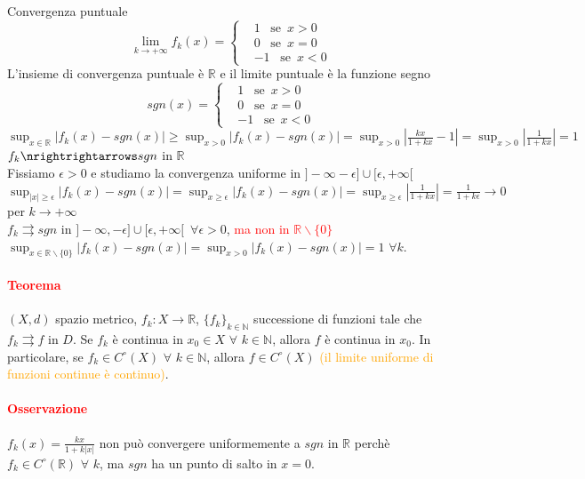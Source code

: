 \documentclass{article}
\newcommand{\R}{\mathbb{R}}
\newcommand{\N}{\mathbb{N}}
\begin{document}
Convergenza puntuale
\begin{equation*}
    \lim_{k\rightarrow +\infty} f_k(x) = \begin{cases}
    & 1 \,\,\,\,\, \text{se}\,\,\, x >0 \\
    & 0 \,\,\,\,\, \text{se}\,\,\, x=0 \\
    & -1  \,\,\,\,\, \text{se}\,\,\, x<0
\end{cases}
\end{equation*}
L'insieme di convergenza puntuale è $\R$ e il limite puntuale è la funzione segno
\begin{equation*}
    sgn(x)= \begin{cases}
    & 1  \,\,\,\,\, \text{se}\,\,\, x>0 \\
    & 0  \,\,\,\,\, \text{se}\,\,\, x=0\\
    & -1  \,\,\,\,\, \text{se}\,\,\, x<0
\end{cases}
\end{equation*}
$\sup_{x\in\R}|f_k(x)-sgn(x)|\geq \sup_{x>0} |f_k(x)-sgn(x)|=\sup_{x>0}|\frac{kx}{1+kx}-1|=\sup_{x>0}|\frac{1}{1+kx}|=1$\\
$f_k \nrightrightarrows sgn$ in $\R$\\
Fissiamo $\epsilon >0$ e studiamo la convergenza uniforme in $]-\infty-\epsilon]\cup[\epsilon,+\infty[$\\
$\sup_{|x|\geq \epsilon} |f_k(x)-sgn(x)|=\sup_{x \geq \epsilon} |f_k(x)-sgn(x)|= \sup_{x \geq \epsilon} |\frac{1}{1+kx}|= \frac{1}{1+k\epsilon}\rightarrow 0$ per $k \rightarrow +\infty$\\
$f_k \rightrightarrows sgn$ in $]-\infty,-\epsilon]\cup[\epsilon,+\infty[\,\,\, \forall \epsilon >0$, \textcolor{red}{ma non in $\R\backslash \{0\}$}\\
$\sup_{x\in\R\backslash \{0\}}|f_k(x)-sgn(x)|=\sup_{x >0}|f_k(x)-sgn(x)|=1\,\, \forall k$.

\paragraph{\textcolor{red}{Teorema}}
$(X,d)$ spazio metrico, $f_k:X \rightarrow \R$, $\{f_k\}_{k \in \N}$ successione di funzioni tale che $f_k \rightrightarrows f$ in $D$. Se $f_k$ è continua in $x_0 \in X \,\, \forall\,\, k \in \N$, allora $f$ è continua in $x_0$. In particolare, se $f_k \in C^\circ(X)\,\, \forall \,\, k \in \N$, allora $f \in C^\circ(X)$ \textcolor{orange}{(il limite uniforme di funzioni continue è continuo)}.

\paragraph{\textcolor{red}{Osservazione}}
$f_k(x)=\frac{kx}{1+k|x|}$ non può convergere uniformemente a $sgn$ in $\R$ perchè $f_k \in C^\circ (\R)\,\, \forall \,\, k$, ma $sgn$ ha un punto di salto in $x=0$.
\end{document}
